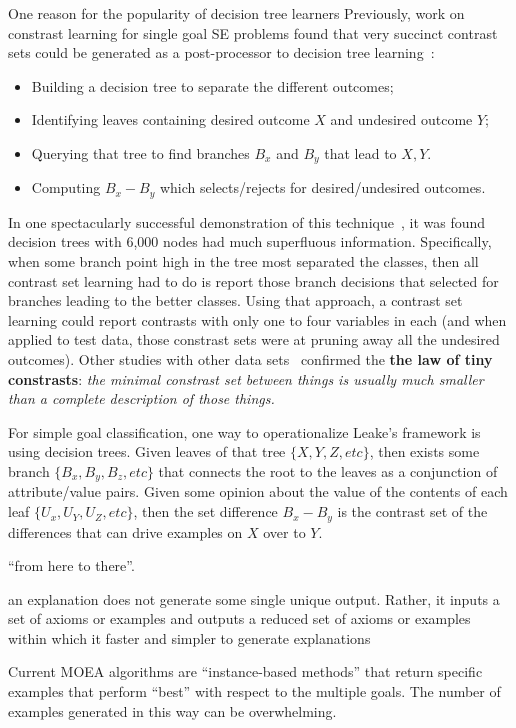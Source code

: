 \documentclass[runningheads]{llncs}
\newcommand{\bi}{\begin{itemize}}
\newcommand{\ei}{\end{itemize}}
\begin{document}
One reason for the popularity of decision tree learners 
Previously, work on
constrast learning for single goal SE problems
found that very succinct contrast sets could be generated as a post-processor
to decision tree learning~\cite{me00e}:
\bi
\item Building a decision tree to separate the different outcomes;
\item Identifying leaves containing desired outcome $X$ and undesired outcome $Y$;
\item Querying that tree to find branches $B_x$ and $B_y$ that lead to
$X,Y$.
\item Computing  $B_x - B_y$ which   selects/rejects for
desired/undesired outcomes.
\ei
In one spectacularly successful demonstration of this technique~\cite{me03c}, it was found decision trees with 6,000 nodes had much
superfluous information.
Specifically, when 
some branch point high in the tree
most separated  the classes, then all contrast
set learning had to do is report those branch decisions that selected
for branches leading to the better classes.
Using that approach, a contrast set learning
could report 
contrasts   with only one to four variables in each (and when
applied to test data, those constrast sets were
at pruning away all the undesired outcomes). Other studies
with other data sets~\cite{me07} 
confirmed the {\bf
the law of tiny constrasts}:  {\em 
the minimal constrast set between things is usually much smaller
than a complete description of those things.}


For simple goal classification, one way to operationalize Leake's
framework is using decision trees. Given leaves of that tree $\{X,Y,Z,etc\}$, 
then exists some branch $\{B_x,B_y,B_z,etc\}$ that connects the root to the leaves
as a conjunction of attribute/value pairs.
Given some
opinion about the value of the contents of each leaf $\{U_x,U_Y,U_Z, etc\}$,  
then the set difference $B_x - B_y$ is the contrast set of the differences
that can drive examples on $X$ over to $Y$.


``from here to there''.

an explanation does not generate some single
unique output. Rather, it inputs a set of axioms or examples and
outputs a reduced set of axioms or examples within which 
it faster and simpler to generate explanations
 
Current MOEA algorithms are ``instance-based methods'' that return
specific examples that perform ``best'' with respect to the multiple goals.
The number of examples generated in this way can be overwhelming.
\end{document}
